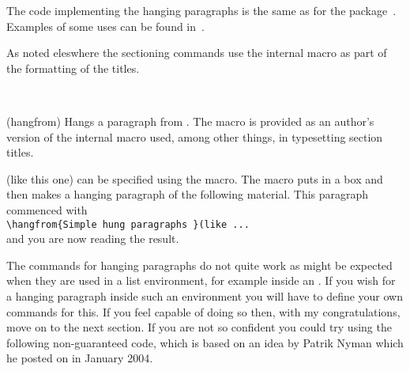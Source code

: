     The code implementing the hanging paragraphs is the same as for
the  package~\cite{HANGING}. Examples of some uses
can be found in~\cite{TTC199}.

    As noted eleswhere the sectioning commands use the internal 
macro \cmd{\@hangfrom} as part of the formatting of the titles.

\begin{syntax}
\cmd{\hangfrom} \\
\end{syntax}
\glossary(hangfrom)%
  {}%
  {Hangs a paragraph from .}
The \cmd{\hangfrom} macro is provided as an author's version of the
internal \cmd{\@hangfrom} macro used, among other things, in typesetting 
section titles.

(like this one) can be specified
using the \cmd{\hangfrom} macro. The macro puts  in a box
and then makes a hanging paragraph of the following material. This
paragraph commenced with \\
\verb?\hangfrom{Simple hung paragraphs }(like ...? \\
and you are now reading the result.

    The commands for hanging paragraphs do not quite work as might be
expected when they are used in a list 
environment, for example inside
an . If you wish for a hanging paragraph inside such an
environment you will have to define your own commands for this. If you
feel capable of doing so then, with my congratulations, move on to the
next section. If you are not so confident you could try using the following
non-guaranteed code, which is based on an idea by Patrik 
Nyman which he posted on \ctt{} in January 2004.
  

